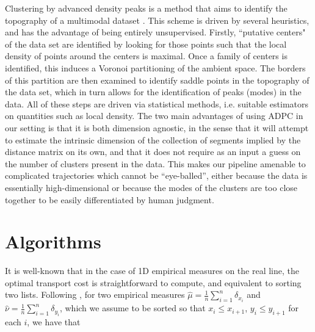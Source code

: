 \documentclass{article}
\begin{document}

Clustering by advanced density peaks is a method that aims to identify the topography of a multimodal dataset \cite{rodriguezClusteringFastSearch2014, derricoAutomaticTopographyHighdimensional2021}. This scheme is driven by several heuristics, and has the advantage of being entirely unsupervised. Firstly, ``putative centers" of the data set are identified by looking for those points such that the local density of points around the centers is maximal. Once a family of centers is identified, this induces a Voronoi partitioning of the ambient space. The borders of this partition are then examined to identify saddle points in the topography of the data set, which in turn allows for the identification of peaks (modes) in the data. All of these steps are driven via statistical methods, i.e. suitable estimators on quantities such as local density. The two main advantages of using ADPC in our setting is that it is both dimension agnostic, in the sense that it will attempt to estimate the intrinsic dimension of the collection of segments implied by the distance matrix on its own, and that it does not require as an input a guess on the number of clusters present in the data. This makes our pipeline amenable to complicated trajectories which cannot be ``eye-balled'', either because the data is essentially high-dimensional or because the modes of the clusters are too close together to be easily differentiated by human judgment.

\section{Algorithms}

It is well-known that in the case of 1D empirical measures on the real line, the optimal transport cost is straightforward to compute, and equivalent to sorting two lists. Following \cite{peyreComputationalOptimalTransport2020}, for two empirical measures \(\hat\mu = \frac{1}{n}\sum\limits_{i=1}^n\delta_{x_i}\) and \(\hat\nu=\frac{1}{n}\sum\limits_{i=1}^n \delta_{y_i}\), which we assume to be sorted so that \(x_i \le x_{i+1}\), \(y_i\le y_{i+1}\) for each \(i\), we have that
\end{document}
